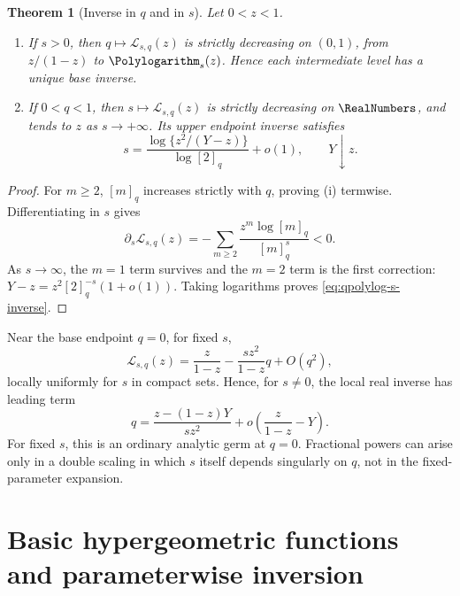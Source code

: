 \documentclass[11pt,a4paper,oneside,openany]{book}
\newtheorem{theorem}{Theorem}[chapter]
\theoremstyle{definition}
\theoremstyle{remark}
\begin{document}
\begin{theorem}[Inverse in \(q\) and in \(s\)]\label{thm:qpolylog-parameter-inverses}
Let \(0<z<1\).
\begin{enumerate}[label=\textup{(\roman*)}]
\item If \(s>0\), then \(q\mapsto\mathcal L_{s,q}(z)\) is strictly decreasing
on \((0,1)\), from \(z/(1-z)\) to \(\Polylogarithm_s(z)\).  Hence each intermediate
level has a unique base inverse.
\item If \(0<q<1\), then \(s\mapsto\mathcal L_{s,q}(z)\) is strictly
decreasing on \(\RealNumbers\), and tends to \(z\) as \(s\to+\infty\).  Its upper
endpoint inverse satisfies
\begin{equation}\label{eq:qpolylog-s-inverse}
 s=\frac{\log\{z^2/(Y-z)\}}{\log[2]_q}+o(1),
 \qquad Y\downarrow z.
\end{equation}
\end{enumerate}
\end{theorem}

\begin{proof}
For \(m\ge2\), \([m]_q\) increases strictly with \(q\), proving (i)
termwise.  Differentiating in \(s\) gives
\[
 \partial_s\mathcal L_{s,q}(z)
 =-\sum_{m\ge2}\frac{z^m\log[m]_q}{[m]_q^s}<0.
\]
As \(s\to\infty\), the \(m=1\) term survives and the \(m=2\) term is the
first correction:
\(Y-z=z^2[2]_q^{-s}(1+o(1))\).  Taking logarithms proves
\eqref{eq:qpolylog-s-inverse}.
\end{proof}

Near the base endpoint \(q=0\), for fixed \(s\),
\begin{equation}\label{eq:qpolylog-qzero}
 \mathcal L_{s,q}(z)
 =\frac{z}{1-z}-\frac{s z^2}{1-z}q+O(q^2),
\end{equation}
locally uniformly for \(s\) in compact sets.  Hence, for \(s\ne0\), the
local real inverse has leading term
\begin{equation}\label{eq:qpolylog-qzero-inverse}
 q=\frac{z-(1-z)Y}{s z^2}+o\!\left(\frac{z}{1-z}-Y\right).
\end{equation}
For fixed \(s\), this is an ordinary analytic germ at \(q=0\).
Fractional powers can arise only in a double scaling in which \(s\) itself
depends singularly on \(q\), not in the fixed-parameter expansion.

\chapter{Basic hypergeometric functions and parameterwise inversion}
\end{document}
